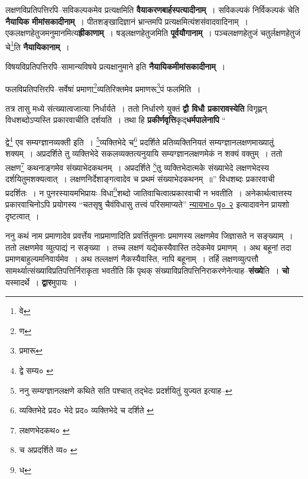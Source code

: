 \documentclass[article,12pt,a4paper]{memoir}
\begin{document}
	  \pstart लक्षणविप्रतिपत्तिरपि--सविकल्पकमेव प्रत्यक्षमिति \textbf{वैयाकरणबार्हस्पत्यादीनाम्} । सविकल्पकं निर्विकल्पकं चेति \textbf{नैयायिक} \leavevmode{} \textbf{मीमांसकादीनाम्} । पीतशङ्खादिज्ञानं भ्रान्तमपि प्रत्यक्षमित्यंशसंवादवादिनाम् । एकलक्षणहेतुजमनुमानमित्य\textbf{ह्रीकाणाम्} । षड्लक्षणहेतुजमिति \textbf{पूर्वयौगानाम्} । पञ्चलक्षणहेतुजं चतुर्लक्षणहेतुजं चे\footnote{वे}\-ति \textbf{नैयायिकानाम्} ।
	\pend
      

	  \pstart विषयविप्रतिपत्तिरपि--सामान्यविषये प्रत्यक्षानुमाने इति \textbf{नैयायिकमीमांसकादीनाम्} ।
	\pend
      

	  \pstart फलविप्रतिपत्तिरपि--सर्वेषां प्रमाणा\footnote{ण}\-व्यतिरिक्तमेव प्रमाणरू\footnote{प्रमारू}\-पं फलमिति ।
	\pend
      

	  \pstart तत्र तासु मध्ये संत्ख्यात्वजात्या निर्धार्यते । ततो निर्धारणे युक्तं \textbf{द्वौ विधौ प्रकारावस्येति} विगृह्णन् विधशब्दोऽप्यस्ति प्रकारवाचीति दर्शयति । तथा हि \textbf{प्रकीर्णवृत्ति}कृद्\textbf{धर्मपालेनापि}  \leavevmode{} “
	  
	द्वे\footnote{द्वे सम्य० \cite{dp-msA} \cite{dp-edP} \cite{dp-edE}} एव सम्यग्ज्ञानव्यक्ती इति । \footnote{ननु सम्यग्ज्ञानलक्षणे कथिते सति पश्चात् तद्भेदः प्रदर्शयितुं युज्यत इत्याह--\cite{dp-msD-n}}\-व्यक्तिभेदे च\footnote{व्यक्तिभेदे प्रद० \cite{dp-msA} \cite{dp-edP} \cite{dp-edH} \cite{dp-edE} \cite{dp-edN} भेदे प्रद० \cite{dp-msB} व्यक्तिभेदे च दर्शिते \cite{dp-msD}} प्रदर्शिते प्रतिव्यक्तिनियतं सम्यग्ज्ञानलक्षणमाख्यातुं शक्यम् । अप्रदर्शिते तु व्यक्तिभेदे सकलव्यक्तत्यनुयायि सम्यग्ज्ञानलक्षणमेकं न शक्यं वक्तुम् । ततो लक्षण\footnote{लक्षणभेदकथ० \cite{dp-msA} \cite{dp-msB} \cite{dp-msD} \cite{dp-edP} \cite{dp-edH} \cite{dp-edE} \cite{dp-edN}} कथनाङ्गमेव संख्याभेदकथनम् । अप्रदर्शिते \footnote{च \cite{dp-msC} अप्रदर्शिते व्य० \cite{dp-msA} \cite{dp-edE}}\-तु व्यक्तिभेदात्मके संख्याभेदे लक्षणभेदस्य दर्शयितुमशक्यत्वात् । लक्षणनिर्देशाङ्गत्वादेव च प्रथमं संख्याभेदकथनम् ॥” विधशब्दः प्रकारवाची प्रदर्शितः । न पुनरस्यायमभिप्रायः--विधा\footnote{ध}\-शब्दो जातिवाचित्वात्प्रकारवाची न भवतीति । अनेकार्थत्वात्तस्य प्रकारवाचिनोऽपि प्रयोगस्य “चतसृषु चैवंविधासु तत्त्वं परिसमाप्यते” \href{http://http://sarit.indology.info/?cref=nbh.1.1.1_p3}{न्यायभा० पृ० २} इत्यादावनेन प्रायशो दृष्टत्वात् ।
	\pend
      

	  \pstart ननु कथं नाम प्रमाणादेव प्रवर्त्तेय नाप्रमाणादिति प्रवर्त्तितुमनाः प्रमाणस्य लक्षणमेव जिज्ञासते न सङ्ख्याम् । ततो लक्षणमेव व्युत्पाद्यं न सङ्ख्या । तच्च लक्षणं यद्येकस्यैवास्ति तदेकमेव प्रमाणम् । अथ बहूनां तदा प्रमाणबाहुल्यमनिवार्यमेव । अथ तल्लक्षणं नैकस्यैवास्ति, नापि बहूनाम् । तर्हि लक्षणव्युत्पत्तौ सामर्थ्यात्संख्याविप्रतिपत्तिर्निराकृता भवतीति किं पृथक् संख्याविप्रतिपत्तिनिराकरणेनेत्याह--\textbf{संख्ये}ति । \textbf{चो} यस्मादर्थे । \textbf{द्वार}मुपायः ।
	\pend
      
\end{document}
